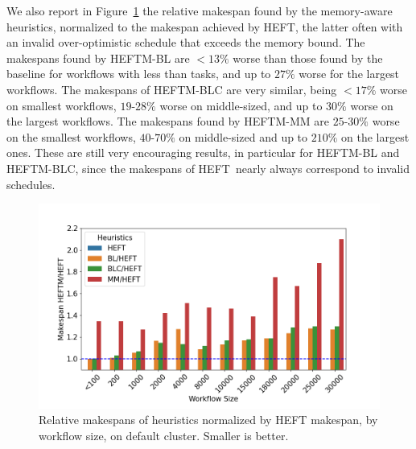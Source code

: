 \documentclass[conference]{IEEEtran}
\newcommand{\algo}[1]{\textsc{#1}}
\newcommand{\heft}{\algo{HEFT}\xspace}
\newcommand{\heftmm}{\algo{HEFTM-MM}\xspace}
\newcommand{\heftbl}{\algo{HEFTM-BL}\xspace}
\newcommand{\heftblc}{\algo{HEFTM-BLC}\xspace}
\newcommand{\new}[1]{{\color{blue}#1}}
\newcommand{\skug}[1]{{\color{blue}[SK: #1]}}
\begin{document}
We also report in  Figure~\ref{fig:ms-relations-by-workflow} the relative makespan found
by the memory-aware heuristics, normalized to the
makespan achieved by \heft, \new{the latter} often with an invalid over-optimistic schedule that exceeds
the memory bound.
\new{The makespans found by \heftbl are $<13\%$ worse than those found by the baseline for workflows with less than \numprint{2000}
tasks, and up to $27\%$ worse for the largest workflows.
The makespans of \heftblc are very similar, being $<17\%$ worse on smallest workflows, $19$-$28\%$ worse on middle-sized,
and up to $30\%$ worse on the largest workflows.
The makespans found by \heftmm are $25$-$30\%$ worse on the smallest workflows, $40$-$70\%$ on middle-sized and up to
$210\%$ on the largest ones.} These are still very encouraging results,
in particular for \heftbl and \heftblc, since the makespans of \heft\ \new{nearly always} correspond to invalid schedules.



%


\begin{figure}[tb]
    \centering
  \vspace{-0.34cm}
  \includegraphics[width=1\columnwidth] {images/ms_relations_by_wf_size_barplot}
    \caption{Relative makespans of heuristics normalized by \heft makespan, by workflow
    size, on default cluster. Smaller is better.}
    \label{fig:ms-relations-by-workflow}
\end{figure}
\end{document}
